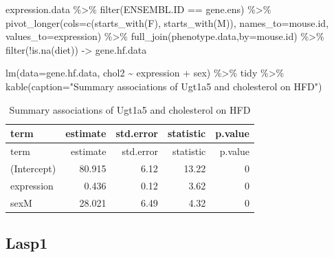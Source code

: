\documentclass[
]{article}
\newenvironment{Shaded}{\begin{snugshade}}{\end{snugshade}}
\newcommand{\AttributeTok}[1]{\textcolor[rgb]{0.77,0.63,0.00}{#1}}
\newcommand{\FunctionTok}[1]{\textcolor[rgb]{0.00,0.00,0.00}{#1}}
\newcommand{\NormalTok}[1]{#1}
\newcommand{\OtherTok}[1]{\textcolor[rgb]{0.56,0.35,0.01}{#1}}
\newcommand{\SpecialCharTok}[1]{\textcolor[rgb]{0.00,0.00,0.00}{#1}}
\newcommand{\StringTok}[1]{\textcolor[rgb]{0.31,0.60,0.02}{#1}}
\begin{document}
\begin{Shaded}
\begin{Highlighting}[]
\NormalTok{expression.data }\SpecialCharTok{\%\textgreater{}\%}
  \FunctionTok{filter}\NormalTok{(ENSEMBL.ID }\SpecialCharTok{==}\NormalTok{ gene.ens) }\SpecialCharTok{\%\textgreater{}\%}
  \FunctionTok{pivot\_longer}\NormalTok{(}\AttributeTok{cols=}\FunctionTok{c}\NormalTok{(}\FunctionTok{starts\_with}\NormalTok{(}\StringTok{\textquotesingle{}F\textquotesingle{}}\NormalTok{),}
                      \FunctionTok{starts\_with}\NormalTok{(}\StringTok{\textquotesingle{}M\textquotesingle{}}\NormalTok{)),}
               \AttributeTok{names\_to=}\StringTok{\textquotesingle{}mouse.id\textquotesingle{}}\NormalTok{,}
               \AttributeTok{values\_to=}\StringTok{\textquotesingle{}expression\textquotesingle{}}\NormalTok{) }\SpecialCharTok{\%\textgreater{}\%}
  \FunctionTok{full\_join}\NormalTok{(phenotype.data,}\AttributeTok{by=}\StringTok{\textquotesingle{}mouse.id\textquotesingle{}}\NormalTok{) }\SpecialCharTok{\%\textgreater{}\%}
  \FunctionTok{filter}\NormalTok{(}\SpecialCharTok{!}\FunctionTok{is.na}\NormalTok{(diet)) }\OtherTok{{-}\textgreater{}}\NormalTok{ gene.hf.data}

\FunctionTok{lm}\NormalTok{(}\AttributeTok{data=}\NormalTok{gene.hf.data, chol2 }\SpecialCharTok{\textasciitilde{}}\NormalTok{ expression }\SpecialCharTok{+}\NormalTok{ sex) }\SpecialCharTok{\%\textgreater{}\%}
\NormalTok{  tidy }\SpecialCharTok{\%\textgreater{}\%}
  \FunctionTok{kable}\NormalTok{(}\AttributeTok{caption=}\StringTok{"Summary associations of Ugt1a5 and cholesterol on HFD"}\NormalTok{)}
\end{Highlighting}
\end{Shaded}

\begin{longtable}[]{@{}lrrrr@{}}
\caption{Summary associations of Ugt1a5 and cholesterol on
HFD}\tabularnewline
\toprule()
term & estimate & std.error & statistic & p.value \\
\midrule()
\endfirsthead
\toprule()
term & estimate & std.error & statistic & p.value \\
\midrule()
\endhead
(Intercept) & 80.915 & 6.12 & 13.22 & 0 \\
expression & 0.436 & 0.12 & 3.62 & 0 \\
sexM & 28.021 & 6.49 & 4.32 & 0 \\
\bottomrule()
\end{longtable}

\hypertarget{lasp1}{%
\subsection{Lasp1}\label{lasp1}}
\end{document}
